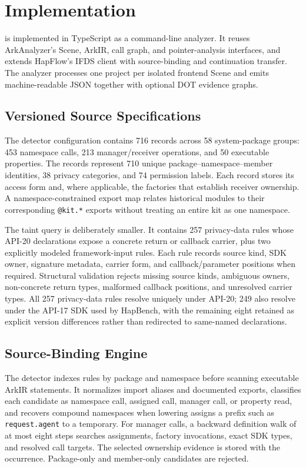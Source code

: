 \section{Implementation}
\label{sec:implementation}

\mytool is implemented in TypeScript as a command-line analyzer. It reuses ArkAnalyzer's Scene, ArkIR, call graph, and pointer-analysis interfaces, and extends HapFlow's IFDS client with source-binding and continuation transfer. The analyzer processes one project per isolated frontend Scene and emits machine-readable JSON together with optional DOT evidence graphs.

\subsection{Versioned Source Specifications}

The detector configuration contains 716 records across 58 system-package groups: 453 namespace calls, 213 manager/receiver operations, and 50 executable properties. The records represent 710 unique package--namespace--member identities, 38 privacy categories, and 74 permission labels. Each record stores its access form and, where applicable, the factories that establish receiver ownership. A namespace-constrained export map relates historical modules to their corresponding \texttt{@kit.*} exports without treating an entire kit as one namespace.

The taint query is deliberately smaller. It contains 257 privacy-data rules whose API-20 declarations expose a concrete return or callback carrier, plus two explicitly modeled framework-input rules. Each rule records source kind, SDK owner, signature metadata, carrier form, and callback/parameter positions when required. Structural validation rejects missing source kinds, ambiguous owners, non-concrete return types, malformed callback positions, and unresolved carrier types. All 257 privacy-data rules resolve uniquely under API-20; 249 also resolve under the API-17 SDK used by HapBench, with the remaining eight retained as explicit version differences rather than redirected to same-named declarations.

\subsection{Source-Binding Engine}

The detector indexes rules by package and namespace before scanning executable ArkIR statements. It normalizes import aliases and documented exports, classifies each candidate as namespace call, assigned call, manager call, or property read, and recovers compound namespaces when lowering assigns a prefix such as \texttt{request.agent} to a temporary. For manager calls, a backward definition walk of at most eight steps searches assignments, factory invocations, exact SDK types, and resolved call targets. The selected ownership evidence is stored with the occurrence. Package-only and member-only candidates are rejected.

